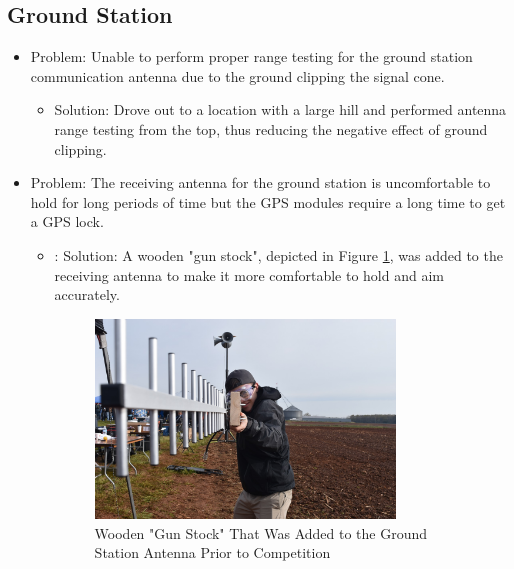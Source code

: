 \documentclass[onecolumn, draftclsnofoot, 10pt, compsoc]{IEEEtran}
\begin{document}
\subsection{Ground Station}
\begin{itemize}
\item Problem: Unable to perform proper range testing for the ground station communication antenna due to the ground clipping the signal cone.
\begin{itemize}
\item Solution: Drove out to a location with a large hill and performed antenna range testing from the top, thus reducing the negative effect of ground clipping.
\end{itemize}
\item Problem: The receiving antenna for the ground station is uncomfortable to hold for long periods of time but the GPS modules require a long time to get a GPS lock.
\begin{itemize}
\item: Solution: A wooden "gun stock", depicted in Figure \ref{figure:Gun Stock}, was added to the receiving antenna to make it more comfortable to hold and aim accurately.

\begin{figure}[H]
	\centering
	\includegraphics[width=0.8\textwidth]{gun_stock.JPG}
	\caption{Wooden "Gun Stock" That Was Added to the Ground Station Antenna Prior to Competition}
    \label{figure:Gun Stock}
\end{figure}

\end{itemize}
\end{itemize}
\end{document}
